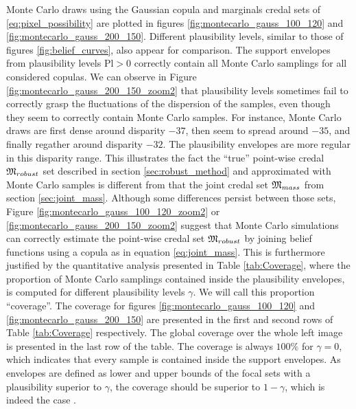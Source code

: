 Monte Carlo draws using the Gaussian copula and marginals credal sets of \ref{eq:pixel_possibility} are plotted in figures \ref{fig:montecarlo_gauss_100_120} and \ref{fig:montecarlo_gauss_200_150}. Different plausibility levels, similar to those of figures \ref{fig:belief_curves}, also appear for comparison. The support envelopes from plausibility levels $\mathrm{Pl}>0$ correctly contain all Monte Carlo samplings for all considered copulas. We can observe in Figure \ref{fig:montecarlo_gauss_200_150_zoom2} that plausibility levels sometimes fail to correctly grasp the fluctuations of the dispersion of the samples, even though they seem to correctly contain Monte Carlo samples. For instance, Monte Carlo draws are first dense around disparity $-37$, then seem to spread around $-35$, and finally regather around disparity $-32$. The plausibility envelopes are more regular in this disparity range. This illustrates the fact the ``true'' point-wise credal ${\mathfrak{M}}_{robust}$ set described in section \ref{sec:robust_method} and approximated with Monte Carlo samples is different from that the joint credal set ${\mathfrak{M}}_{mass}$ from section \ref{sec:joint_mass}. Although some differences persist between those sets, Figure \ref{fig:montecarlo_gauss_100_120_zoom2} or \ref{fig:montecarlo_gauss_200_150_zoom2} suggest that Monte Carlo simulations can correctly estimate the point-wise credal set ${\mathfrak{M}}_{robust}$ by joining belief functions using a copula as in equation \eqref{eq:joint_mass}. This is furthermore justified by the  quantitative analysis presented in Table \ref{tab:Coverage}, where the proportion of Monte Carlo samplings contained inside the plausibility envelopes, is computed for different plausibility levels $\gamma$. We will call this proportion ``coverage''. The coverage for figures \ref{fig:montecarlo_gauss_100_120} and \ref{fig:montecarlo_gauss_200_150} are presented in the first and second rows of Table \ref{tab:Coverage} respectively. The global coverage over the whole left image is presented in the last row of the table. The coverage is always $100\%$ for $\gamma=0$, which indicates that every sample is contained inside the support envelopes.  As envelopes are defined as lower and upper bounds of the focal sets with a plausibility superior to $\gamma$, the coverage should be superior to $1-\gamma$, which is indeed the case .

